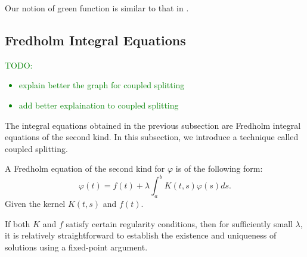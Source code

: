\documentclass[a4paper,12pt]{article}
\begin{document}
\begin{related}
    Our notion of green function is similar to that in \cite{hwang_simulationtabulation_2001}.
\end{related}


\subsection{Fredholm Integral Equations}

\textcolor{green}{
    TODO:
    \begin{itemize}
        \item explain better the graph for coupled splitting
        \item add better explaination to coupled splitting
    \end{itemize}
}

The integral equations obtained in the previous subsection are Fredholm integral
equations of the second kind. In this subsection, we introduce a technique called
coupled splitting.


\begin{definition}
    A Fredholm equation of the second kind for $\varphi$  is of the following form:
    \begin{equation}
        \varphi(t)=f(t)+\lambda \int_a^b K(t, s) \varphi(s) ds.
    \end{equation}
    Given the kernel  $K(t, s)$  and  $ f(t)$.
\end{definition}

If both $K$ and $f$ satisfy certain regularity conditions, then for sufficiently
small $\lambda$, it is relatively straightforward to establish the existence
and uniqueness of solutions using a fixed-point argument.

\end{document}
